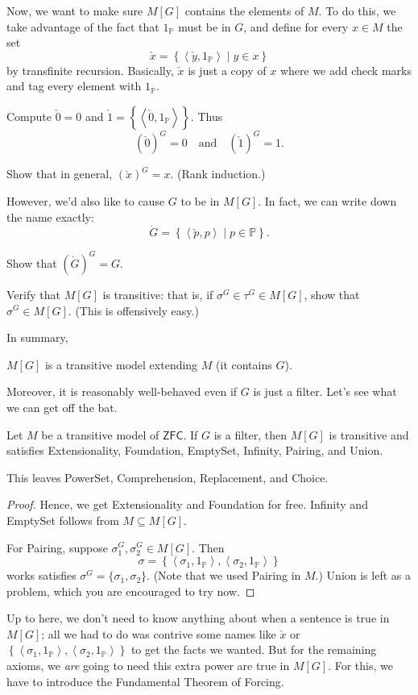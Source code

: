 \documentclass[11pt]{scrreprt}
\newcommand{\ZFC}{\mathsf{ZFC}}
\newcommand{\Po}{\mathbb P}
\begin{document}
Now, we want to make sure $M[G]$ contains the elements of $M$.
To do this, we take advantage of the fact that $1_\Po$ must be in $G$, and define
for every $x \in M$ the set
\[ \check x = \left\{ \left<\check y, 1_\Po\right> \mid y \in x \right\} \]
by transfinite recursion.
Basically, $\check x$ is just a copy of $x$ where we add check marks and tag every element with $1_\Po$.

\begin{example}
	Compute $\check 0 = 0$ and $\check 1 = \left\{ \left<\check 0, 1_\Po\right> \right\}$.
	Thus \[ (\check 0)^G = 0 \quad\text{and}\quad (\check 1)^G = 1. \]
\end{example}
\begin{ques}
	Show that in general, $(\check x)^G = x$.
	(Rank induction.)
\end{ques}

However, we'd also like to cause $G$ to be in $M[G]$.
In fact, we can write down the name exactly:
\[ \dot G = \left\{ \left<\check p, p\right> \mid p \in \Po \right\}. \]
\begin{ques}
	Show that $(\dot G)^G = G$.
\end{ques}
\begin{ques}
	Verify that $M[G]$ is transitive:
	that is, if $\sigma^G \in \tau^G \in M[G]$, show that $\sigma^G \in M[G]$.
	(This is offensively easy.)
\end{ques}

In summary,
\begin{moral}
	$M[G]$ is a transitive model extending $M$ (it contains $G$).
\end{moral}

Moreover, it is reasonably well-behaved even if $G$ is just a filter.
Let's see what we can get off the bat.
\begin{lemma}
	Let $M$ be a transitive model of $\ZFC$.
	If $G$ is a filter, then $M[G]$ is transitive
	and satisfies Extensionality, Foundation, EmptySet, Infinity, Pairing, and Union.
\end{lemma}
This leaves PowerSet, Comprehension, Replacement, and Choice.
\begin{proof}
	Hence, we get Extensionality and Foundation for free.
	Infinity and EmptySet follows from $M \subseteq M[G]$.

	For Pairing, suppose $\sigma_1^G, \sigma_2^G \in M[G]$.
	Then
	\[ \sigma = 
		\left\{ \left<\sigma_1, 1_\Po\right>, \left<\sigma_2, 1_\Po\right> \right\}
	\]
	works satisfies $\sigma^G = \{\sigma_1, \sigma_2\}$.
	(Note that we used Pairing in $M$.)
	Union is left as a problem, which you are encouraged to try now.
\end{proof}
Up to here, we don't need to know anything about when a sentence is true in $M[G]$;
all we had to do was contrive some names like $\check x$ or
$\left\{ \left<\sigma_1, 1_\Po\right>, \left<\sigma_2, 1_\Po\right> \right\}$
to get the facts we wanted.
But for the remaining axioms, we \emph{are} going to need this extra power
are true in $M[G]$.
For this, we have to introduce the Fundamental Theorem of Forcing.
\end{document}
